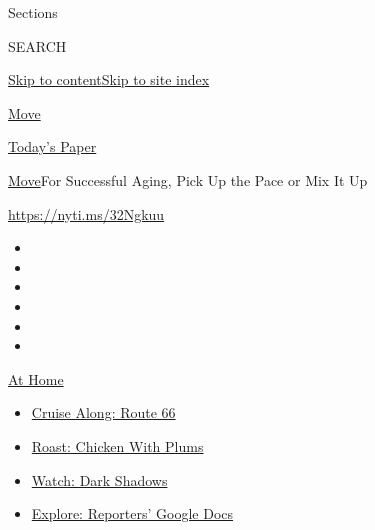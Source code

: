 Sections

SEARCH

\protect\hyperlink{site-content}{Skip to
content}\protect\hyperlink{site-index}{Skip to site index}

\href{https://www.nytimes3xbfgragh.onion/section/well/move}{Move}

\href{https://myaccount.nytimes3xbfgragh.onion/auth/login?response_type=cookie\&client_id=vi}{}

\href{https://www.nytimes3xbfgragh.onion/section/todayspaper}{Today's
Paper}

\href{/section/well/move}{Move}\textbar{}For Successful Aging, Pick Up
the Pace or Mix It Up

\url{https://nyti.ms/32Ngkuu}

\begin{itemize}
\item
\item
\item
\item
\item
\item
\end{itemize}

\href{https://www.nytimes3xbfgragh.onion/spotlight/at-home?action=click\&pgtype=Article\&state=default\&region=TOP_BANNER\&context=at_home_menu}{At
Home}

\begin{itemize}
\tightlist
\item
  \href{https://www.nytimes3xbfgragh.onion/2020/09/07/travel/route-66.html?action=click\&pgtype=Article\&state=default\&region=TOP_BANNER\&context=at_home_menu}{Cruise
  Along: Route 66}
\item
  \href{https://www.nytimes3xbfgragh.onion/2020/09/04/dining/sheet-pan-chicken.html?action=click\&pgtype=Article\&state=default\&region=TOP_BANNER\&context=at_home_menu}{Roast:
  Chicken With Plums}
\item
  \href{https://www.nytimes3xbfgragh.onion/2020/09/04/arts/television/dark-shadows-stream.html?action=click\&pgtype=Article\&state=default\&region=TOP_BANNER\&context=at_home_menu}{Watch:
  Dark Shadows}
\item
  \href{https://www.nytimes3xbfgragh.onion/interactive/2020/at-home/even-more-reporters-editors-diaries-lists-recommendations.html?action=click\&pgtype=Article\&state=default\&region=TOP_BANNER\&context=at_home_menu}{Explore:
  Reporters' Google Docs}
\end{itemize}

